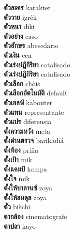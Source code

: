 \textbf{ ตัวละคร  } karakter \\
\textbf{ ตัววาย  } igrèk \\
\textbf{ ตัวหนา  } diki \\
\textbf{ ตัวอย่าง  } caso \\
\textbf{ ตัวอักษร  } abesedario \\
\textbf{ ตัวเงิน  } cen \\
\textbf{ ตัวเร่งปฎิกิริยา  } catalisado \\
\textbf{ ตัวเร่งปฏิกิริยา  } catalisado \\
\textbf{ ตัวเลือก  } chòis \\
\textbf{ ตัวเลือกอัตโนมัติ  } default \\
\textbf{ ตัวเอลฟ์  } kabouter \\
\textbf{ ตัวแทน  } representante \\
\textbf{ ตัวแปร  } diferensia \\
\textbf{ ตั้งความหวัง  } meta \\
\textbf{ ตั้งด่านตรวจ  } barikadiá \\
\textbf{ ตั้งท้อง  } priña \\
\textbf{ ตั้งเป้า  } mik \\
\textbf{ ตั้งแคมป์  } kampa \\
\textbf{ ตั้งใจ  } mik \\
\textbf{ ตั้งให้บาลานซ์  } zoya \\
\textbf{ ตั้งให้สมดุล  } zoya \\
\textbf{ ตั๋ว  } bièchi \\
\textbf{ ตากล้อง  } cinematografo \\
\textbf{ ตาปลา  } kayo \\
